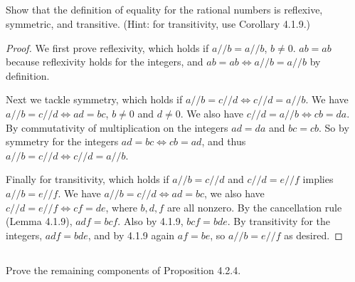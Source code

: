 \documentclass[../../main.tex]{subfiles}
\begin{document}

\subsection{}
\begin{q}
    Show that the definition of equality for the rational numbers is reflexive, symmetric, and transitive. (Hint: for transitivity, use Corollary 4.1.9.)
\end{q}

\begin{proof}
    We first prove reflexivity, 
    which holds if $a // b = a // b$, $b \neq 0$.
    $ab=ab$ because reflexivity holds for the integers, 
    and $ab=ab \iff a // b = a // b$ by definition.

    Next we tackle symmetry, 
    which holds if  $a // b = c // d \iff c // d = a // b$. 
    We have $a // b = c // d \iff ad = bc$, $b \neq 0$ and $d \neq 0$.
    We also have $c // d = a // b \iff cb = da$. 
    By commutativity of multiplication on the integers $ad = da$ and $bc = cb$.
    So by symmetry for the integers $ad = bc \iff cb = ad$, 
    and thus $a // b = c // d \iff c // d = a // b$.     

    Finally for transitivity, which holds if $a // b = c // d$ and $c // d = e // f$ implies $a // b = e // f$.
    We have $a // b = c // d \iff ad = bc$,
    we also have $c // d = e // f \iff cf = de$,
    where $b, d, f$ are all nonzero.
    By the cancellation rule (Lemma 4.1.9), $adf = bcf$.
    Also by 4.1.9, $bcf = bde$.
    By transitivity for the integers, $adf = bde$, 
    and by 4.1.9 again $af = be$,
    so $a // b = e // f$ as desired.
\end{proof}

\addtocounter{subsection}{1}
\subsection{}
\begin{q}
    Prove the remaining components of Proposition 4.2.4.    
\end{q}
\end{document}
